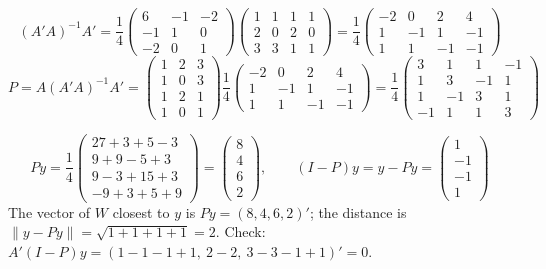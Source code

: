\documentclass[12pt]{article}
\theoremstyle{definition}
\begin{document}
\begin{board}[\((A'A)^{-1}A'\) and \(P\):]
\[
(A'A)^{-1}A'=\frac14\begin{pmatrix}6&-1&-2\\-1&1&0\\-2&0&1\end{pmatrix}\begin{pmatrix}1&1&1&1\\2&0&2&0\\3&3&1&1\end{pmatrix}
=\frac14\begin{pmatrix}-2&0&2&4\\1&-1&1&-1\\1&1&-1&-1\end{pmatrix}
\]
\[
P=A(A'A)^{-1}A'=\begin{pmatrix}1&2&3\\1&0&3\\1&2&1\\1&0&1\end{pmatrix}
\frac14\begin{pmatrix}-2&0&2&4\\1&-1&1&-1\\1&1&-1&-1\end{pmatrix}
=\frac14\begin{pmatrix}3&1&1&-1\\1&3&-1&1\\1&-1&3&1\\-1&1&1&3\end{pmatrix}
\]
\end{board}
\begin{board}
\[
Py=\frac14\begin{pmatrix}27+3+5-3\\9+9-5+3\\9-3+15+3\\-9+3+5+9\end{pmatrix}=\begin{pmatrix}8\\4\\6\\2\end{pmatrix},\qquad
(I-P)y=y-Py=\begin{pmatrix}1\\-1\\-1\\1\end{pmatrix}
\]
The vector of \(W\) closest to \(y\) is \(Py=(8,4,6,2)'\); the distance is
\(\lVert y-Py\rVert=\sqrt{1+1+1+1}=2\). Check: \(A'(I-P)y=(1-1-1+1,\ 2-2,\ 3-3-1+1)'=0\).
\end{board}
\end{document}
